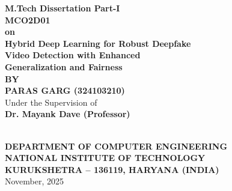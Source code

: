 \documentclass[12pt,oneside,a4paper]{report}
\begin{document}
\thispagestyle{empty}


\vspace*{0.5cm}
\begin{center}
    {\Large \textbf{M.Tech Dissertation Part-I}}\\[0.3cm]
    {\Large \textbf{MCO2D01}}\\[1cm]

    {\large \textbf{on}}\\[1cm]

    {\LARGE \textbf{Hybrid Deep Learning for Robust Deepfake}}\\[0.2cm]
    {\LARGE \textbf{Video Detection with Enhanced}}\\[0.2cm]
    {\LARGE \textbf{Generalization and Fairness}}\\[1.5cm]

    {\large \textbf{BY}}\\[0.5cm]
    {\Large \textbf{PARAS GARG (324103210)}}\\[1.5cm]

    {\large Under the Supervision of}\\[0.3cm]
    {\large \textbf{Dr. Mayank Dave (Professor)}}\\[1cm]

    \\[1cm]

    {\large \textbf{DEPARTMENT OF COMPUTER ENGINEERING}}\\[0.3cm]
    {\large \textbf{NATIONAL INSTITUTE OF TECHNOLOGY}}\\[0.3cm]
    {\large \textbf{KURUKSHETRA -- 136119, HARYANA (INDIA)}}\\[0.5cm]
    {\large November, 2025}
\end{center}

\clearpage
\end{document}
